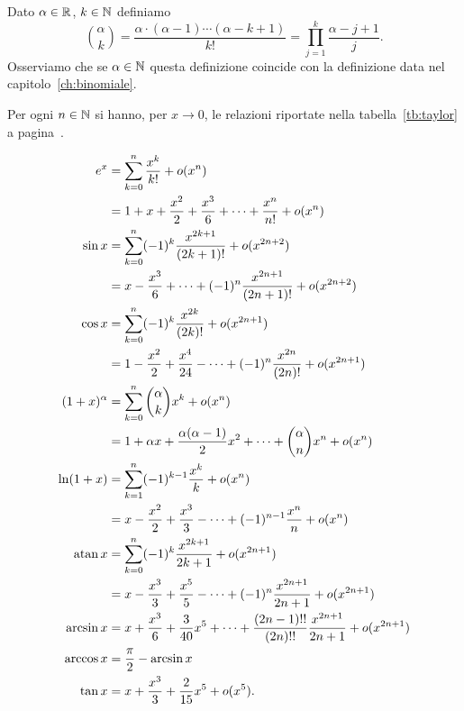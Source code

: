 \begin{definition}
\label{def:binomiale_reale}%
\mymark{***}%
Dato $\alpha \in {\mathbb R}$, $k \in {\mathbb N}$ definiamo
\[
 {\alpha \choose k } 
 = \frac{\alpha \cdot (\alpha-1) \cdots (\alpha -k +1)}{k!}
 = \prod_{j=1}^k \frac{\alpha-j+1}{j}.
\]
Osserviamo che se $\alpha \in {\mathbb N}$ questa definizione coincide
con la definizione data nel capitolo~\ref{ch:binomiale}.
\end{definition}

\begin{theorem}
\label{th:sviluppi_taylor}%
\mymark{***}%
Per ogni $n\in {\mathbb N}$ si hanno, per $x\to 0$,
le relazioni riportate nella tabella~\ref{tb:taylor}
a pagina~\pageref{tb:taylor}.
\end{theorem}
\begin{table}
\begin{align*}
e^x &= \sum_{k=0}^n \frac{x^k}{k!} + o(x^n) \\
  &= 1 + x + \frac{x^2}{2} + \frac {x^3}{6} + \dots + \frac{x^n}{n!} + o(x^n) \\
\sin x &= \sum_{k=0}^n (-1)^k\frac{x^{2k+1}}{(2k+1)!} + o(x^{2n+2}) \\
 &= x - \frac{x^3}{6} + \dots + (-1)^{n} \frac{x^{2n+1}}{(2n+1)!}  + o(x^{2n+2})\\
 \cos x &= \sum_{k=0}^n (-1)^k \frac{x^{2k}}{(2k)!} + o(x^{2n+1}) \\
   &= 1 - \frac{x^2}{2} + \frac{x^4}{24} - \dots + (-1)^n\frac{x^{2n}}{(2n)!} + o(x^{2n+1})\\
 (1+x)^\alpha &= \sum_{k=0}^n {\alpha \choose k} x^k + o(x^n)\\
    &= 1 + \alpha x + \frac{\alpha (\alpha-1)}{2} x^2 + \dots + {\alpha \choose n} x^n + o(x^n) \\
  \ln (1+x) &= \sum_{k=1}^n (-1)^{k-1} \frac{x^k}{k} + o(x^n) \\
         &= x - \frac{x^2}{2} + \frac{x^3}{3} - \dots + (-1)^{n-1}\frac{x^n}{n} + o(x^n) \\
  \operatorname{atan} x &= \sum_{k=0}^n (-1)^k \frac{x^{2k+1}}{2k+1} + o(x^{2n+1})\\
    &= x - \frac{x^3}{3} + \frac{x^5}{5} - \dots + (-1)^n \frac{x^{2n+1}}{2n +1} + o(x^{2n+1})\\
  \arcsin x &= x + \frac{x^3}{6} + \frac{3}{40} x^5 + \dots + \frac{(2n-1)!!}{(2n)!!} \frac{x^{2n+1}}{2n+1} + o(x^{2n+1}) \\
  \arccos x &= \frac \pi 2 - \arcsin x\\
  \operatorname{tan} x &= x + \frac{x^3}{3} + \frac{2}{15} x^5 + o(x^5).
\end{align*}
\caption{sviluppi di Taylor, per $x\to 0$, di alcune funzioni elementari.
%
%
Si veda il teorema~\ref{th:sviluppi_taylor}.}
\label{tb:taylor}%
\end{table}
